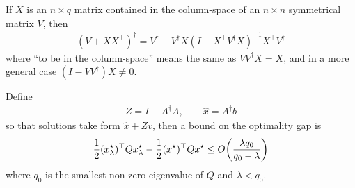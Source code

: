 \documentclass[12pt]{article}
\begin{document}
\begin{theorem}
  \label{thm:kovanic}
  If \(X\) is an \(n \times q\) matrix contained in the column-space
  of an \(n \times n\) symmetrical matrix \(V\), then
  \begin{align*}
    (V + X X^\top)^\dagger
      = V^\dagger
        - V ^\dagger X (I + X^\top V^\dagger X)^{-1} X^\top V^\dagger
  \end{align*}
  where ``to be in the column-space'' means the same as
  \(V V^\dagger X = X\),
  and in a more general case
  \((I - V V^\dagger)X \neq 0\).
\end{theorem}

\begin{theorem}
  Define
  \begin{align*}
    Z = I - A ^\dagger A,
      \qquad \hat{x} = A^\dagger b
  \end{align*}
  so that solutions take form \(\hat{x} + Z v\),
  then a bound on the optimality gap is
  \begin{align*}
    \frac{1}{2} (x_\lambda ^\star)^\top Q x_\lambda ^\star
      - \frac{1}{2} (x^\star)^\top Q x^\star
      \leq O{\left(\frac{\lambda q_0}{q_0 - \lambda}\right)}
  \end{align*}
  where \(q_0\) is the smallest non-zero eigenvalue of
  \(Q\) and \(\lambda < q_0\).
\end{theorem}
\end{document}
